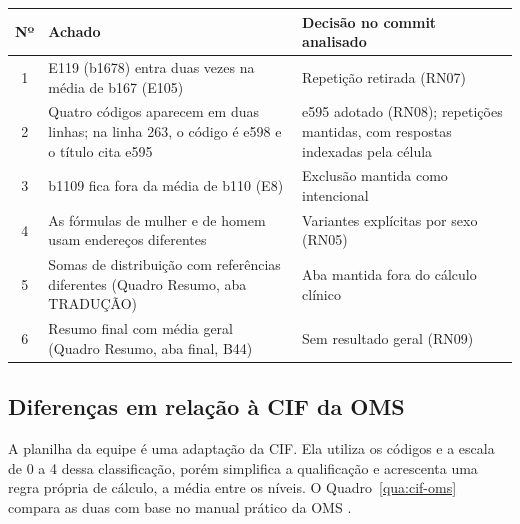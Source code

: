 \begin{quadro}[H]
	\centering
	\caption{Achados da auditoria das fórmulas da planilha CIF e decisões registradas}
	\label{qua:cif-achados}
	\footnotesize
	\begin{tabularx}{\textwidth}{|c|>{\raggedright\arraybackslash}X|>{\raggedright\arraybackslash}p{}|}
		\hline
		Nº & Achado & Decisão no commit analisado \\ \hline
		1 & E119 (b1678) entra duas vezes na média de b167 (E105) & Repetição retirada (RN07) \\ \hline
		2 & Quatro códigos aparecem em duas linhas; na linha 263, o código é e598 e o título cita e595 & e595 adotado
			(RN08); repetições mantidas, com respostas indexadas pela célula \\ \hline
		3 & b1109 fica fora da média de b110 (E8) & Exclusão mantida como intencional \\ \hline
		4 & As fórmulas de mulher e de homem usam endereços diferentes & Variantes explícitas por sexo (RN05) \\ \hline
		5 & Somas de distribuição com referências diferentes (Quadro Resumo, aba TRADUÇÃO) & Aba mantida fora do
			cálculo clínico \\ \hline
		6 & Resumo final com média geral (Quadro Resumo, aba final, B44) & Sem resultado geral (RN09) \\ \hline
	\end{tabularx}
\end{quadro}

\subsection{Diferenças em relação à CIF da OMS}
\label{sec:cif-oms}

A planilha da equipe é uma adaptação da CIF. Ela utiliza os códigos e a escala de 0 a 4 dessa classificação, porém
simplifica a qualificação e acrescenta uma regra própria de cálculo, a média entre os níveis. O
Quadro~\ref{qua:cif-oms} compara as duas com base no manual prático da OMS \cite{who2013howtouse}.

